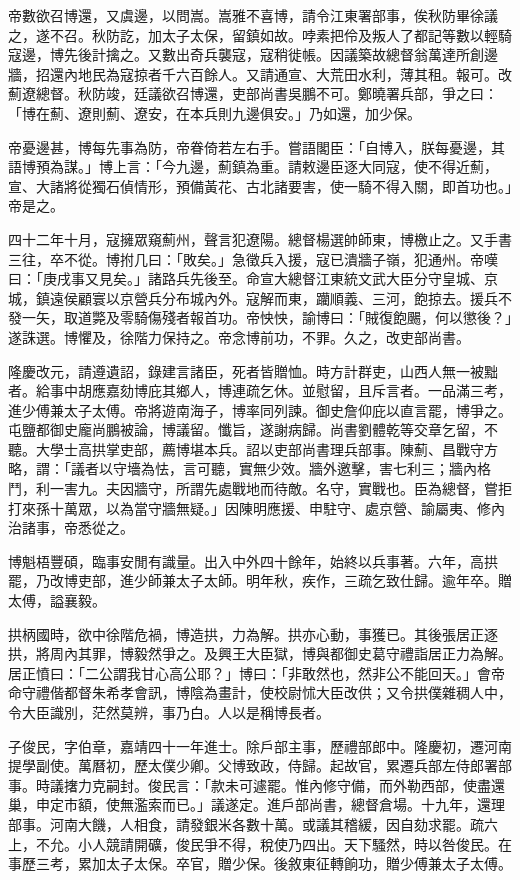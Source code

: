 \begin{pinyinscope}
帝數欲召博還，又虞邊，以問嵩。嵩雅不喜博，請令江東署部事，俟秋防畢徐議之，遂不召。秋防訖，加太子太保，留鎮如故。哱素把伶及叛人了都記等數以輕騎寇邊，博先後計擒之。又數出奇兵襲寇，寇稍徙帳。因議築故總督翁萬達所創邊牆，招還內地民為寇掠者千六百餘人。又請通宣、大荒田水利，薄其租。報可。改薊遼總督。秋防竣，廷議欲召博還，吏部尚書吳鵬不可。鄭曉署兵部，爭之曰：「博在薊、遼則薊、遼安，在本兵則九邊俱安。」乃如還，加少保。

帝憂邊甚，博每先事為防，帝眷倚若左右手。嘗語閣臣：「自博入，朕每憂邊，其語博預為謀。」博上言：「今九邊，薊鎮為重。請敕邊臣逐大同寇，使不得近薊，宣、大諸將從獨石偵情形，預備黃花、古北諸要害，使一騎不得入關，即首功也。」帝是之。

四十二年十月，寇擁眾窺薊州，聲言犯遼陽。總督楊選帥師東，博檄止之。又手書三往，卒不從。博拊几曰：「敗矣。」急徵兵入援，寇已潰牆子嶺，犯通州。帝嘆曰：「庚戌事又見矣。」諸路兵先後至。命宣大總督江東統文武大臣分守皇城、京城，鎮遠侯顧寰以京營兵分布城內外。寇解而東，躪順義、三河，飽掠去。援兵不發一矢，取道斃及零騎傷殘者報首功。帝怏怏，諭博曰：「賊復飽颺，何以懲後？」遂誅選。博懼及，徐階力保持之。帝念博前功，不罪。久之，改吏部尚書。

隆慶改元，請遵遺詔，錄建言諸臣，死者皆贈恤。時方計群吏，山西人無一被黜者。給事中胡應嘉劾博庇其鄉人，博連疏乞休。並慰留，且斥言者。一品滿三考，進少傅兼太子太傅。帝將遊南海子，博率同列諫。御史詹仰庇以直言罷，博爭之。屯鹽都御史龐尚鵬被論，博議留。懺旨，遂謝病歸。尚書劉體乾等交章乞留，不聽。大學士高拱掌吏部，薦博堪本兵。詔以吏部尚書理兵部事。陳薊、昌戰守方略，謂：「議者以守墻為怯，言可聽，實無少效。牆外邀擊，害七利三；牆內格鬥，利一害九。夫因牆守，所謂先處戰地而待敵。名守，實戰也。臣為總督，嘗拒打來孫十萬眾，以為當守牆無疑。」因陳明應援、申駐守、處京營、諭屬夷、修內治諸事，帝悉從之。

博魁梧豐碩，臨事安閒有識量。出入中外四十餘年，始終以兵事著。六年，高拱罷，乃改博吏部，進少師兼太子太師。明年秋，疾作，三疏乞致仕歸。逾年卒。贈太傅，謚襄毅。

拱柄國時，欲中徐階危禍，博造拱，力為解。拱亦心動，事獲已。其後張居正逐拱，將周內其罪，博毅然爭之。及興王大臣獄，博與都御史葛守禮詣居正力為解。居正憤曰：「二公謂我甘心高公耶？」博曰：「非敢然也，然非公不能回天。」會帝命守禮偕都督朱希孝會訊，博陰為畫計，使校尉怵大臣改供；又令拱僕雜稠人中，令大臣識別，茫然莫辨，事乃白。人以是稱博長者。

子俊民，字伯章，嘉靖四十一年進士。除戶部主事，歷禮部郎中。隆慶初，遷河南提學副使。萬曆初，歷太僕少卿。父博致政，侍歸。起故官，累遷兵部左侍郎署部事。時議撦力克嗣封。俊民言：「款未可遽罷。惟內修守備，而外勒西部，使盡還巢，申定市額，使無濫索而已。」議遂定。進戶部尚書，總督倉場。十九年，還理部事。河南大饑，人相食，請發銀米各數十萬。或議其稽緩，因自劾求罷。疏六上，不允。小人競請開礦，俊民爭不得，稅使乃四出。天下騷然，時以咎俊民。在事歷三考，累加太子太保。卒官，贈少保。後敘東征轉餉功，贈少傅兼太子太傅。


\end{pinyinscope}
